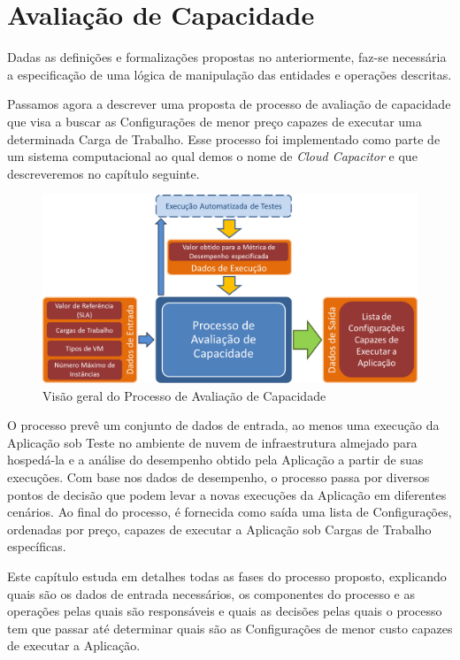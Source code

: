\chapter[Avaliação de Capacidade]{Avaliação de Capacidade}
Dadas as definições e formalizações propostas no anteriormente, faz-se necessária
a especificação de uma lógica de manipulação das entidades e operações descritas.

Passamos agora a descrever uma proposta de processo de avaliação de capacidade
que visa a buscar as Configurações de menor preço capazes de executar uma determinada 
Carga de Trabalho. Esse processo foi implementado como parte de um sistema 
computacional ao qual demos o nome de \emph{Cloud Capacitor} e que descreveremos 
no capítulo seguinte.  

\begin{figure}[htb]
  \caption{\label{fig_processo_alto_nivel}Visão geral do Processo de Avaliação de Capacidade}
  \begin{center}
    \includegraphics[scale=0.6]{img/processoAltoNivel}
  \end{center}
\end{figure}

O processo prevê um conjunto de dados de entrada, ao menos uma execução da 
Aplicação sob Teste no ambiente de nuvem de infraestrutura almejado para 
hospedá-la e a análise do desempenho obtido pela Aplicação a partir 
de suas execuções. Com base nos dados de desempenho, o processo passa por diversos
pontos de decisão que podem levar a novas execuções da Aplicação em diferentes 
cenários. Ao final do processo, é fornecida como saída uma lista de Configurações, 
ordenadas por preço, capazes de executar a Aplicação sob Cargas de Trabalho específicas.

Este capítulo estuda em detalhes todas as fases do processo 
proposto, explicando quais são os dados de entrada necessários, os componentes do 
processo e as operações pelas quais são responsáveis e quais as decisões pelas quais
o processo tem que passar até determinar quais são as Configurações de menor custo
capazes de executar a Aplicação.


